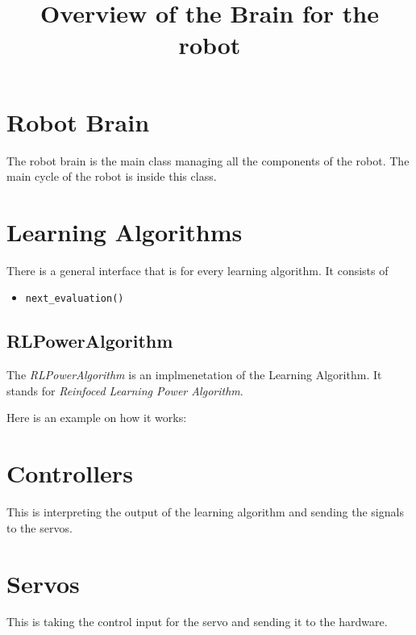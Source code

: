 \documentclass[a4paper,10pt]{article}
\title{Overview of the Brain for the robot}
\author{}
\begin{document}
\maketitle

\tableofcontents

\section{Robot Brain}
The robot brain is the main class managing all the components of the robot.
The main cycle of the robot is inside this class.

\section{Learning Algorithms}
There is a general interface that is for every learning algorithm. It consists 
of
\begin{itemize}
 \item \verb|next_evaluation()|
\end{itemize}

\subsection{RLPowerAlgorithm}
The \emph{RLPowerAlgorithm} is an implmenetation of the Learning Algorithm. It
stands for \emph{Reinfoced Learning Power Algorithm}.


Here is an example on how it works: %

\section{Controllers}
This is interpreting the output of the learning algorithm and sending the 
signals to the servos.

\section{Servos}
This is taking the control input for the servo and sending it to the hardware.
\end{document}
